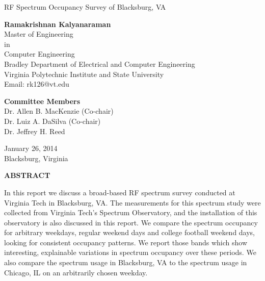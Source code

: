 \documentclass[12pt,sts]{report}
\begin{document}

\thispagestyle{empty}
\begin{center}

{\Large 
RF Spectrum Occupancy Survey of Blacksburg, VA
}

\vfill

\textbf{Ramakrishnan Kalyanaraman} \\
Master of Engineering \\
in \\
Computer Engineering \\
Bradley Department of Electrical and Computer Engineering \\
Virginia Polytechnic Institute and State University \\
Email: rk126@vt.edu

\vfill

\textbf{Committee Members} \\
Dr. Allen B. MacKenzie (Co-chair) \\
Dr. Luiz A. DaSilva (Co-chair) \\
Dr. Jeffrey H. Reed

\vfill

January 26, 2014 \\
Blacksburg, Virginia

\end{center}

\pagebreak

\thispagestyle{empty}

\begin{center}

\textbf{ABSTRACT}

\end{center}

In this report we discuss a broad-based RF spectrum survey conducted at Virginia Tech in Blacksburg, VA. The measurements for this spectrum study were collected from Virginia Tech's Spectrum Observatory, and the installation of this observatory is also discussed in this report. We compare the spectrum occupancy for arbitrary weekdays, regular weekend days and college football weekend days, looking for consistent occupancy patterns. We report those bands which show interesting, explainable variations in spectrum occupancy over these periods. We also compare the spectrum usage in Blacksburg, VA to the spectrum usage in Chicago, IL on an arbitrarily chosen weekday.
\end{document}
